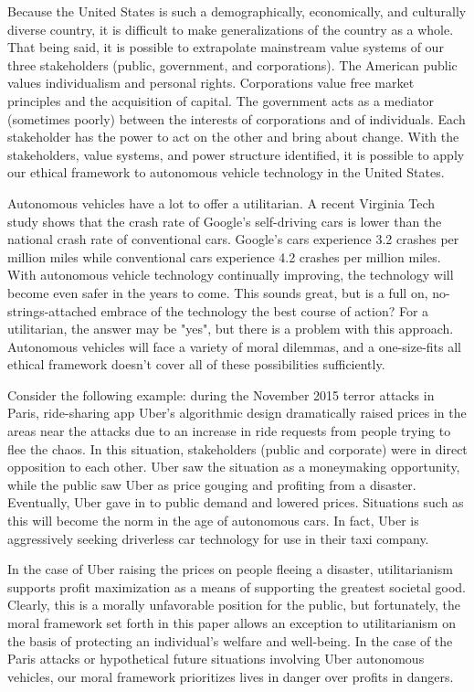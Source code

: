 Because the United States is such a demographically, economically, and 
culturally diverse country, it is difficult to make generalizations of 
the country as a whole. That being said, it is possible to extrapolate 
mainstream value systems of our three stakeholders (public, government, and 
corporations). The American public values individualism and personal rights. 
Corporations value free market principles and the acquisition of capital. 
The government acts as a mediator (sometimes poorly) between the interests of
corporations and of individuals. Each stakeholder has the power to act on the other 
and bring about change. With the stakeholders, value systems, and power structure
identified, it is possible to apply our ethical framework to autonomous vehicle 
technology in the United States.

Autonomous vehicles have a lot to offer a utilitarian. A recent 
Virginia Tech study\cite{blanco2016automated} shows that the crash 
rate of Google's self-driving cars is lower than the national crash rate 
of conventional cars. Google's cars experience 3.2 crashes per million 
miles while conventional cars experience 4.2 crashes per million miles. 
With autonomous vehicle technology continually improving, the technology 
will become even safer in the years to come. This sounds great, but is a full on, 
no-strings-attached embrace of the technology the best course of action? For a 
utilitarian, the answer may be "yes", but there is a problem with this approach. 
Autonomous vehicles will face a variety of moral dilemmas, and a one-size-fits all 
ethical framework doesn't cover all of these possibilities sufficiently. 

Consider the following example: during the November 2015 terror attacks 
in Paris, ride-sharing app Uber's algorithmic design dramatically raised 
prices in the areas near the attacks due to an increase in ride requests 
from people trying to flee the chaos. In this situation, stakeholders (public and 
corporate) were in direct opposition to each other. Uber saw the 
situation as a moneymaking opportunity, while the public saw Uber as 
price gouging and profiting from a disaster. Eventually, Uber gave in 
to public demand and lowered prices. Situations such as this will become 
the norm in the age of autonomous cars. In fact, Uber is aggressively 
seeking driverless car technology for use in their taxi company.

In the case of Uber raising the prices on people fleeing a disaster, utilitarianism 
supports profit maximization as a means of supporting the greatest societal good.
Clearly, this is a morally unfavorable position for the public, but fortunately, the moral 
framework set forth in this paper allows an exception to utilitarianism
on the basis of protecting an individual's welfare and well-being. In the case
of the Paris attacks or hypothetical future situations involving Uber autonomous
vehicles, our moral framework prioritizes lives in danger over profits in dangers. 


